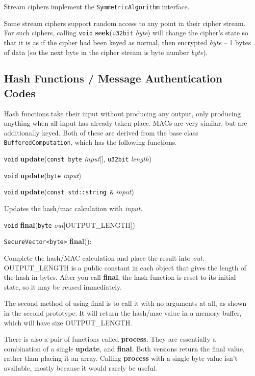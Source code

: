 \documentclass{article}
\newcommand{\function}[1]{\textbf{#1}}
\newcommand{\type}[1]{\texttt{#1}}
\renewcommand{\arg}[1]{\textsl{#1}}
\begin{document}
Stream ciphers implement the \type{SymmetricAlgorithm} interface.

Some stream ciphers support random access to any point in their cipher
stream. For such ciphers, calling \type{void} \function{seek}(\type{u32bit}
\arg{byte}) will change the cipher's state so that it is as if the cipher had been
keyed as normal, then encrypted \arg{byte} -- 1 bytes of data (so the next byte
in the cipher stream is byte number \arg{byte}).

\subsection{Hash Functions / Message Authentication Codes}

Hash functions take their input without producing any output, only producing
anything when all input has already taken place. MACs are very similar, but are
additionally keyed. Both of these are derived from the base class
\type{BufferedComputation}, which has the following functions.

\noindent
\type{void} \function{update}(\type{const byte} \arg{input}[], \type{u32bit}
\arg{length})

\noindent
\type{void} \function{update}(\type{byte} \arg{input})

\noindent
\type{void} \function{update}(\type{const std::string \&} \arg{input})

Updates the hash/mac calculation with \arg{input}.

\noindent
\type{void} \function{final}(\type{byte} \arg{out}[OUTPUT\_LENGTH])

\noindent
\type{SecureVector<byte>} \function{final}():

Complete the hash/MAC calculation and place the result into \arg{out}.
OUTPUT\_LENGTH is a public constant in each object that gives the length of the
hash in bytes. After you call \function{final}, the hash function is reset to
its initial state, so it may be reused immediately.

The second method of using final is to call it with no arguments at all, as
shown in the second prototype. It will return the hash/mac value in a memory
buffer, which will have size OUTPUT\_LENGTH.

There is also a pair of functions called \function{process}. They are
essentially a combination of a single \function{update}, and \function{final}.
Both versions return the final value, rather than placing it an array. Calling
\function{process} with a single byte value isn't available, mostly because it
would rarely be useful.
\end{document}
